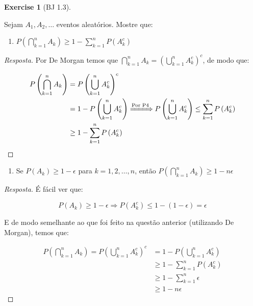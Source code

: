 \documentclass[
]{article}
\providecommand{\tightlist}{%
  \setlength{\itemsep}{0pt}\setlength{\parskip}{0pt}}
\theoremstyle{definition}
\theoremstyle{definition}
\theoremstyle{definition}
\newtheorem{exercise}{Exercise}[section]
\theoremstyle{definition}
\theoremstyle{remark}
\begin{document}
\begin{exercise}[BJ 1.3]
\protect\hypertarget{exr:exbj3}{}\label{exr:exbj3}

Sejam \(A_{1}, A_{2},\dots\) eventos aleatórios. Mostre que:

\begin{enumerate}
\def\labelenumi{\alph{enumi})}
\tightlist
\item
  \(P\left(\bigcap_{k=1}^{n}A_{k}\right) \ge 1 - \sum_{k=1}^{n}P(A_{k}^{c})\)
\end{enumerate}

\begin{proof}[Resposta]
Por De Morgan temos que \(\bigcap_{k=1}^{n}A_{k} = \left(\bigcup_{k=1}^{n}A_{k}^{c}\right)^{c}\), de modo que:

\begin{align*}
P\left(\bigcap_{k=1}^{n}A_{k}\right) &= P\left(\bigcup_{k=1}^{n}A_{k}^{c}\right)^{c} \\
&= 1 - P\left(\bigcup_{k=1}^{n}A_{k}^{c}\right) \xRightarrow[]{\text{Por P4}} P\left(\bigcup_{k=1}^{n}A_{k}^{c}\right) \le \sum_{k=1}^{n}P\left(A_{k}^{c}\right) \\
&\ge 1 - \sum_{k=1}^{n}P\left(A_{k}^{c}\right)
\end{align*}
\end{proof}

\begin{enumerate}
\def\labelenumi{\alph{enumi})}
\setcounter{enumi}{1}
\tightlist
\item
  Se \(P(A_{k}) \ge 1 - \epsilon\) para \(k = 1,2,\dots,n\), então \(P(\bigcap_{k=1}^{n}A_{k}) \ge 1 - n\epsilon\)
\end{enumerate}

\begin{proof}[Resposta]
É fácil ver que:

\[
P(A_{k}) \ge 1 - \epsilon \Rightarrow P(A_{k}^{c}) \le 1 - (1-\epsilon) = \epsilon
\]

E de modo semelhante ao que foi feito na questão anterior (utilizando De Morgan), temos que:

\begin{align*}
P\left(\bigcap_{k=1}^{n}A_{k}\right) = P\left(\bigcup_{k=1}^{n}A_{k}^{c}\right)^{c} &= 1 - P\left(\bigcup_{k=1}^{n}A_{k}^{c}\right)\\
&\ge 1 - \sum_{k=1}^{n}P\left(A_{k}^{c}\right) \\
&\ge 1 - \sum_{k=1}^{n}\epsilon\\
&\ge 1 - n\epsilon
\end{align*}
\end{proof}


\end{exercise}
\end{document}
